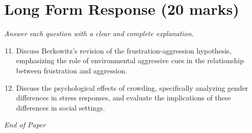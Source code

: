 \documentclass[12pt]{article}
\begin{document}
\section*{Long Form Response (20 marks)}
\textit{Answer each question with a clear and complete explanation.}
\begin{enumerate}[label=\arabic*.]
\setcounter{enumi}{10}
\item Discuss Berkowitz's revision of the frustration-aggression hypothesis, emphasizing the role of environmental aggressive cues in the relationship between frustration and aggression.
\item Discuss the psychological effects of crowding, specifically analyzing gender differences in stress responses, and evaluate the implications of these differences in social settings.
\end{enumerate}

\vfill
\noindent\textit{End of Paper}
\end{document}
